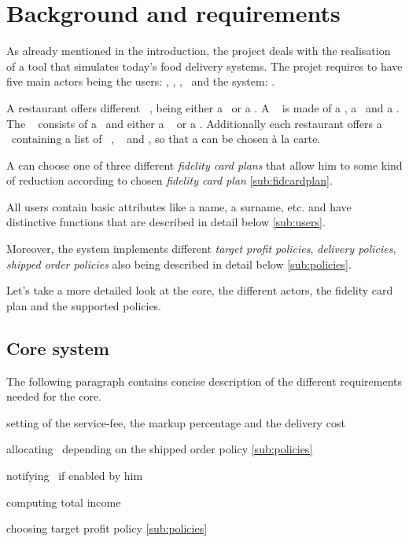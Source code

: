 \section{Background and requirements} %
\label{sec:background}

As already mentioned in the introduction, the project deals with the realisation of
a tool that simulates today's food delivery systems. The projet requires to have five main 
actors being the users: \Restaurant, \Customer, \Manager, \Courier~and the system: \Core.

A restaurant offers different \Meal~, being either a \HalfMeal~or a  
\FullMeal. A \FullMeal~ is made of a \Starter, a \MainDish~and a \Dessert. The \HalfMeal~ consists 
of a \MainDish~and either a \Starter~ or a \Dessert. Additionally each restaurant offers a \Menu~containing 
a list of \Starter~, \MainDish~ and \Dessert, so that a \Meal can be chosen à la carte. 

A \Customer can choose one of three different \emph{fidelity card plans} that allow him to some kind of reduction 
according to chosen \emph{fidelity card plan} \ref{sub:fidcardplan}.

All users contain basic attributes like a name, a surname, etc. and have distinctive functions that are described 
in detail below \ref{sub:users}.

Moreover, the system implements different \emph{target profit policies}, \emph{delivery policies}, \emph{shipped order policies}
also being described in detail below \ref{sub:policies}.

Let's take a more detailed look at the core, the different actors, the fidelity card plan and the supported policies.

\subsection{Core system} %
\label{sub:core_system}
The following paragraph contains concise description  
of the different requirements needed for the core.

\vspace{0.3\baselineskip}

\begin{itemize}
  \begin{minipage}{0.47\linewidth}
    \item setting of the service-fee, the markup percentage and the delivery cost
    \item allocating \Courier~depending on the shipped order policy \ref{sub:policies}
    \item notifying \Customer~if enabled by him
  \end{minipage}
  \begin{minipage}{0.53\linewidth}
   \item computing total income 
   \item choosing target profit policy \ref{sub:policies}
  \end{minipage}
\end{itemize}



